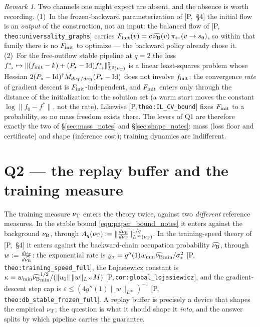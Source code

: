 \documentclass[11pt]{article}
\theoremstyle{definition}
\theoremstyle{remark}
\newtheorem{remark}[theorem]{Remark}
\def\lambda{\widehat\nuB}
\newcommand{\paperref}[1]{[P,\,\texttt{#1}]}   %
\begin{document}
\begin{remark}\label{rem:training_notes}
Two channels one might expect are absent, and the absence is worth recording.
(1)~In the frozen-backward parameterization of [P,~\S4] the initial flow is an
\emph{output} of the construction, not an input: the balanced flow of
\paperref{theo:universality\_graphs} carries
$\Finit(v)=c\,\lambda(v)\,\BackwardPolicy(v\rightarrow s_0)$, so within that family there
is no $F_{\mathrm{init}}$ to optimize --- the backward policy already chose it.
(2)~For the free-outflow stable pipeline at $q=2$ the loss
$f^*_{\rightarrow}\mapsto\|(f_{\mathrm{init}}-k)+(P_\star-\mathrm{Id})f^*_{\rightarrow}\|^2_{L^2(\nu_{\mathrm{T}})}$ is a
linear least-squares problem whose Hessian $2(P_\star-\mathrm{Id})^\dagger
M_{d\nu_{\mathrm{T}}/d\nu_{\mathrm{B}}}(P_\star-\mathrm{Id})$ does not involve $f_{\mathrm{init}}$: the convergence
\emph{rate} of gradient descent is $F_{\mathrm{init}}$-independent, and $F_{\mathrm{init}}$ enters only through
the distance of the initialization to the solution set (a warm start moves the constant
$\log\|f_0-f^*\|$, not the rate). Likewise \paperref{theo:IL\_CV\_bound} fixes $F_{\mathrm{init}}$ to
a probability, so no mass freedom exists there. The levers of Q1 are therefore exactly the
two of \S\ref{sec:mass_notes} and \S\ref{sec:shape_notes}: mass (loss floor and certificate) and shape
(inference cost); training dynamics are indifferent.
\end{remark}

\section{Q2 --- the replay buffer and the training measure}\label{sec:replay_notes}

The training measure $\nu_{\mathrm{T}}$ enters the theory twice, against two \emph{different}
reference measures. In the stable bound \eqref{equ:paper_bound_notes} it enters against the
background $\nu_{\mathrm{B}}$, through $A_q(\nu_{\mathrm{T}}):=\|\frac{d\nu_{\mathrm{B}}}{d\nu_{\mathrm{T}}}\|^{1/q}_{L^\infty(\nu_{\mathrm{T}})}$.
In the training-speed theory of [P,~\S4] it enters against the backward-chain occupation
probability $\lambda$, through $w:=\frac{d\nutrain}{d\lambda}$: the exponential rate is
$\varrho_\sigma=g''(1)w_{\min}\lambda_{\min}/\sigma_*^2$
\paperref{theo:training\_speed\_full}, the \L ojasiewicz constant is
$\kappa=w_{\min}\lambda_{\min}^{1/2}/(\|u_0\|\,\|w\|_{L^\infty}M)$
\paperref{cor:global\_lojasiewicz}, and the gradient-descent step cap is
$\varepsilon\leq(4g''(1)\|w\|_{L^\infty})^{-1}$ \paperref{theo:db\_stable\_frozen\_full}.
A replay buffer is precisely a device that shapes the empirical $\nu_{\mathrm{T}}$; the question
is what it should shape it \emph{into}, and the answer splits by which pipeline carries
the guarantee.
\end{document}
